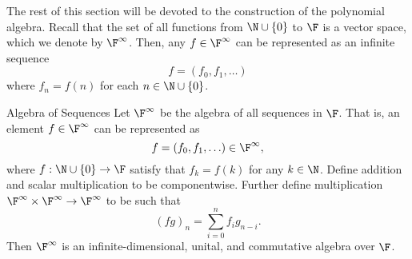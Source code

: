 \documentclass[linearalgebraII]{subfiles}
\begin{document}
    \begin{remark}
        The rest of this section will be devoted to the construction of the polynomial algebra. Recall that the set of all functions from $\N\cup \left\lbrace 0 \right\rbrace$ to $\F$ is a vector space, which we denote by $\F^\infty$. Then, any $f\in\F^\infty$ can be represented as an infinite sequence
        \begin{equation*}
            f = \left( f_0, f_1, \ldots \right) 
        \end{equation*}
        where $f_n = f(n)$ for each $n\in\N\cup \left\lbrace 0 \right\rbrace$.
    \end{remark}

    \begin{prop}{Algebra of Sequences}
        Let $\F^\infty$ be the algebra of all sequences in $\F$. That is, an element $f\in \F^\infty$ can be represented as
        \begin{equation*}
            f = \left( f_0, f_1, \ldots \right) \in \F^\infty, 
        \end{equation*}
        where $f: \N\cup \left\lbrace 0 \right\rbrace \to \F$ satisfy that $f_k = f(k)$ for any $k\in \N$. Define addition and scalar multiplication to be componentwise. Further define multiplication $\F^\infty\times\F^\infty\to\F^\infty$ to be such that
        \begin{equation*}
            \left( fg \right)_n = \sum^n_{i=0} f_ig_{n-i}.
        \end{equation*}
        Then $\F^\infty$ is an infinite-dimensional, unital, and commutative algebra over $\F$.
    \end{prop}
\end{document}
